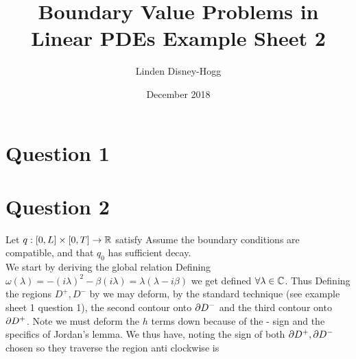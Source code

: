 \documentclass{article}
\title{Boundary Value Problems in Linear PDEs Example Sheet 2}
\author{Linden Disney-Hogg}
\date{December 2018}
\begin{document}
\maketitle
\tableofcontents

\section{Question 1}

\section{Question 2}

Let $q:[0,L] \times [0,T] \to \mathbb{R}$ satisfy 
Assume the boundary conditions are compatible, and that $q_0$ has sufficient decay.\\
We start by deriving the global relation 
Defining $\omega(\lambda) = -(i\lambda)^2 -\beta(i\lambda) = \lambda(\lambda-i\beta)$ we get 
defined $\forall \lambda \in \mathbb{C}$. Thus 
Defining the regions $D^+,D^-$ by 
we may deform, by the standard technique (see example sheet 1 question 1), the second contour onto $\partial D^-$ and the third contour onto $\partial D^+$. Note we must deform the $h$ terms down because of the - sign and the specifics of Jordan's lemma. We thus have, noting the sign of both $\partial D^+, \partial D^-$ chosen so they traverse the region anti clockwise is 
\end{document}
